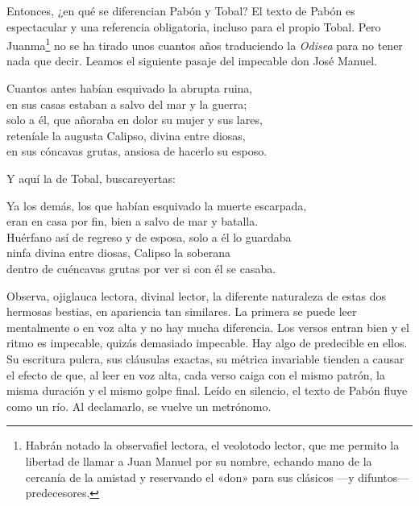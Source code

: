 Entonces, ¿en qué se diferencian Pabón y Tobal?
%
El texto de Pabón es espectacular y una referencia obligatoria, incluso para el propio Tobal. Pero Juanma\footnote{Habrán notado la observafiel lectora, el veolotodo lector, que me permito la libertad de llamar a Juan Manuel por su nombre, echando mano de la cercanía de la amistad y reservando el «don» para sus clásicos ---y difuntos--- predecesores.} no se ha tirado unos cuantos años traduciendo la \emph{Odisea} para no tener nada que decir. Leamos el siguiente pasaje del impecable don José Manuel.

\begin{versocita}
Cuantos antes habían esquivado la abrupta ruina,\\
en sus casas estaban a salvo del mar y la guerra;\\
solo a él, que añoraba en dolor su mujer y sus lares,\\
reteníale la augusta Calipso, divina entre diosas,\\
en sus cóncavas grutas, ansiosa de hacerlo su esposo.
\end{versocita}

Y aquí la de Tobal, buscareyertas:

\begin{versocita}
Ya los demás, los que habían esquivado la muerte escarpada,\\
eran en casa por fin, bien a salvo de mar y batalla.\\
Huérfano así de regreso y de esposa, solo a él lo guardaba\\
ninfa divina entre diosas, Calipso la soberana\\
dentro de cuéncavas grutas por ver si con él se casaba.
\end{versocita}

Observa, ojiglauca lectora, divinal lector, la diferente naturaleza de estas dos hermosas bestias, en apariencia tan similares. La primera se puede leer mentalmente o en voz alta y no hay mucha diferencia. Los versos entran bien y el ritmo es impecable, quizás demasiado impecable. Hay algo de predecible en ellos. Su escritura pulcra, sus cláusulas exactas, su métrica invariable tienden a causar el efecto de que, al leer en voz alta, cada verso caiga con el mismo patrón, la misma duración y el mismo golpe final. Leído en silencio, el texto de Pabón fluye como un río. Al declamarlo, se vuelve un metrónomo.

